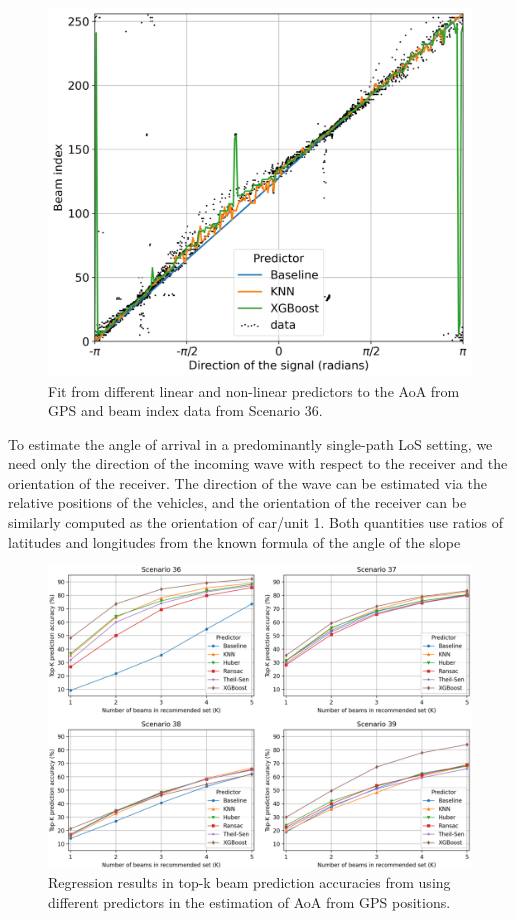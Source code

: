 \documentclass[10pt,comsoc]{IEEEtran}
\begin{document}
\begin{figure}[t]
	\centering
	\includegraphics[width=1\columnwidth]{predictors_figure_big}
	\caption{Fit from different linear and non-linear predictors to the AoA from GPS and beam index data from Scenario 36.}
	\label{fig:pred_fit}
	\vspace{-.3cm}
\end{figure}
To estimate the angle of arrival in a predominantly single-path LoS setting, we need only the direction of the incoming wave with respect to the receiver and the orientation of the receiver. The direction of the wave can be estimated via the relative positions of the vehicles, and the orientation of the receiver can be similarly computed as the orientation of car/unit 1. Both quantities use ratios of latitudes and longitudes from the known formula of the angle of the slope

\begin{figure}[t]
	\centering
	\includegraphics[width=1.84\columnwidth]{ML_results}
	\caption{Regression results in top-k beam prediction accuracies from using different predictors in the estimation of AoA from GPS positions. }
	\label{fig:ml_results}
	\vspace{-2mm}
\end{figure}
\end{document}
